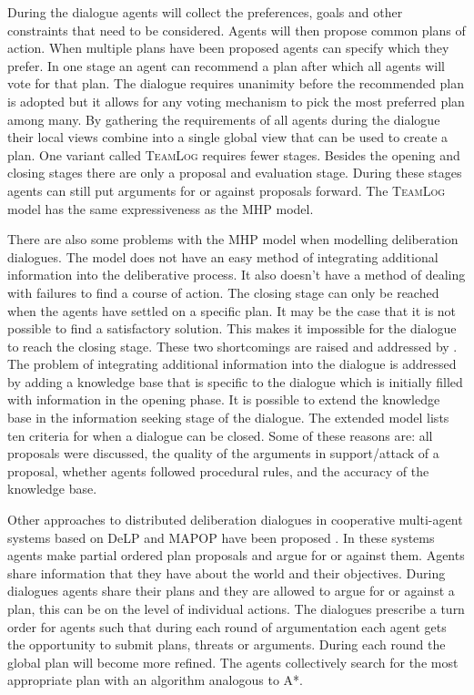 During the dialogue agents will collect the preferences, goals and other
constraints that need to be considered. Agents will then propose common plans
of action. When multiple plans have been proposed agents can specify which they
prefer. In one stage an agent can recommend a plan after which all agents
will vote for that plan. The dialogue requires unanimity before the recommended
plan is adopted but it allows for any voting mechanism to pick the most
preferred plan among many. By gathering the requirements of all agents during
the dialogue their local views combine into a single global view that can be
used to create a plan. One variant called \textsc{TeamLog}
\cite{dunin-keplicz2011} requires fewer stages. Besides the opening and closing
stages there are only a proposal and evaluation stage. During these stages
agents can still put arguments for or against proposals forward. The
\textsc{TeamLog} model has the same expressiveness as the MHP model.

There are also some problems with the MHP model when modelling
deliberation dialogues. The model does not have an easy method of integrating
additional information into the deliberative process. It also doesn't have a
method of dealing with failures to find a course of action. The closing stage
can only be reached when the agents have settled on a specific plan. It may be
the case that it is not possible to find a satisfactory solution. This makes it
impossible for the dialogue to reach the closing stage. These two shortcomings
are raised and addressed by \cite{walton2014}. The problem of integrating
additional information into the dialogue is addressed by adding a knowledge
base that is specific to the dialogue which is initially filled with
information in the opening phase. It is possible to extend the knowledge base
in the information seeking stage of the dialogue. The extended model lists ten
criteria for when a dialogue can be closed. Some of these reasons are: all
proposals were discussed, the quality of the arguments in support/attack of a
proposal, whether agents followed procedural rules, and the accuracy of the
knowledge base.

Other approaches to distributed deliberation dialogues in cooperative
multi-agent systems based on \textsf{DeLP} and MAPOP have been proposed 
\cite{ferrando2012,pardo2011}. In these systems agents make partial ordered 
plan proposals and 
argue for or against them. Agents share information that they have 
about the world and their objectives. During dialogues agents share their plans 
and they are allowed to argue for or against a plan, this can be on the level 
of individual actions. The dialogues prescribe a turn order for agents such 
that during each round of argumentation each agent gets the opportunity to 
submit plans, threats or arguments. During each round the global plan will 
become more refined. The agents collectively search for the most appropriate 
plan with an algorithm analogous to A*.

